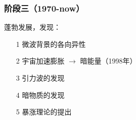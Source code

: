 \subsubsection{阶段三（1970-now）}
\par 
蓬勃发展，发现：
\begin{itemize}
	\item[1] 微波背景的各向异性
	\item[2] 宇宙加速膨胀 $\rightarrow$ 暗能量（1998年）
	\item[3] 引力波的发现
	\item[4] 暗物质的发现
	\item[5] 暴涨理论的提出
\end{itemize}